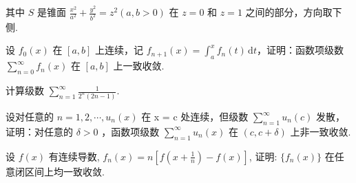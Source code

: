 其中 $S$ 是锥面 $\frac{x^2}{a^2} +\frac{y^2}{b^2} = z^2 (a,b > 0)$ 在 $z = 0$ 和 $z = 1$ 之间的部分，方向取下侧.\par
设 $f_0(x)$ 在 $[a, b]$ 上连续，记 $f_{n+1}(x) = \int_a^x f_n(t) \, \mathrm{d}t$，证明：函数项级数 $\sum_{n=0}^{\infty} f_n(x)$ 在 $[a, b]$ 上一致收敛.\par
计算级数 $\sum_{n=1}^{\infty} \frac{1}{2^n(2n-1)}$.\par
设对任意的  $n = 1, 2, \cdots, u_{n}(x)$  在 x = c 处连续，但级数  $\sum_{n=1}^{\infty} u_{n}(c)$  发散，证明：对任意的  $\delta > 0$ ，函数项级数  $\sum_{n=1}^{\infty} u_{n}(x)$  在  $(c, c + \delta)$  上非一致收敛.\par
设 $f(x)$ 有连续导数, $f_{n}(x) = n\left[f\left(x + \frac{1}{n}\right) - f(x)\right]$, 证明: $\{f_{n}(x)\}$ 在任意闭区间上均一致收敛.\par
